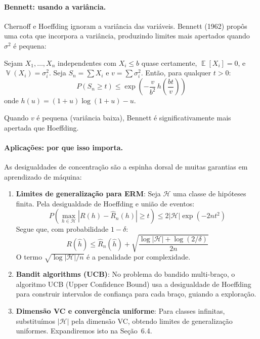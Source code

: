 \documentclass{tufte-handout}
\DeclareMathOperator{\E}{\mathbb{E}}
\DeclareMathOperator{\Var}{\mathbb{V}}
\begin{document}
\paragraph{Bennett: usando a variância.}

Chernoff e Hoeffding ignoram a variância das variáveis. Bennett (1962) propôs uma cota que incorpora a variância, produzindo limites mais apertados quando $\sigma^2$ é pequena:

\begin{thm}
    Sejam $X_1, \dots, X_n$ independentes com $X_i \le b$ quase certamente, $\E[X_i] = 0$, e $\Var(X_i) = \sigma_i^2$. Seja $S_n = \sum X_i$ e $v = \sum \sigma_i^2$. Então, para qualquer $t > 0$:
    \[
    P(S_n \ge t) \le \exp\!\left(-\frac{v}{b^2} \, h\!\left(\frac{bt}{v}\right)\right)
    \]
    onde $h(u) = (1+u)\log(1+u) - u$.
\end{thm}

Quando $v$ é pequena (variância baixa), Bennett é significativamente mais apertada que Hoeffding.

\paragraph{Aplicações: por que isso importa.}

As desigualdades de concentração são a espinha dorsal de muitas garantias em aprendizado de máquina:

\begin{enumerate}
    \item \textbf{Limites de generalização para ERM}: Seja $\mathcal{H}$ uma classe de hipóteses finita. Pela desigualdade de Hoeffding e união de eventos:
    \[
    P\!\left(\max_{h \in \mathcal{H}} |R(h) - \hat{R}_n(h)| \ge t\right) \le 2|\mathcal{H}| \exp(-2nt^2)
    \]
    Segue que, com probabilidade $1-\delta$:
    \[
    R(\hat{h}) \le \hat{R}_n(\hat{h}) + \sqrt{\frac{\log|\mathcal{H}| + \log(2/\delta)}{2n}}
    \]
    O termo $\sqrt{\log|\mathcal{H}|/n}$ é a penalidade por complexidade.

    \item \textbf{Bandit algorithms (UCB)}: No problema do bandido multi-braço, o algoritmo UCB (Upper Confidence Bound) usa a desigualdade de Hoeffding para construir intervalos de confiança para cada braço, guiando a exploração.

    \item \textbf{Dimensão VC e convergência uniforme}: Para classes infinitas, substituímos $|\mathcal{H}|$ pela dimensão VC, obtendo limites de generalização uniformes. Expandiremos isto na Seção~6.4.
\end{enumerate}
\end{document}
